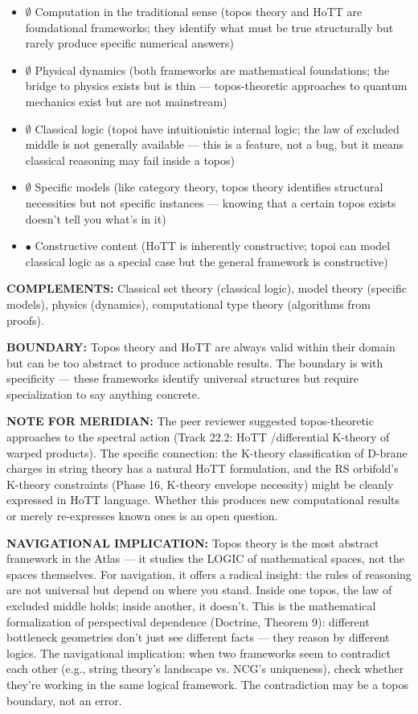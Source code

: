 \begin{itemize}[nosep,leftmargin=*]
  \item $\emptyset$ Computation in the traditional sense (topos theory and HoTT are foundational frameworks; they identify what must be true structurally but rarely produce specific numerical answers)
  \item $\emptyset$ Physical dynamics (both frameworks are mathematical foundations; the bridge to physics exists but is thin — topos-theoretic approaches to quantum mechanics exist but are not mainstream)
  \item $\emptyset$ Classical logic (topoi have intuitionistic internal logic; the law of excluded middle is not generally available — this is a feature, not a bug, but it means classical reasoning may fail inside a topos)
  \item $\emptyset$ Specific models (like category theory, topos theory identifies structural necessities but not specific instances — knowing that a certain topos exists doesn't tell you what's in it)
  \item $\bullet$ Constructive content (HoTT is inherently constructive; topoi can model classical logic as a special case but the general framework is constructive)
\end{itemize}


\textbf{COMPLEMENTS:} Classical set theory (classical logic), model theory (specific models), physics (dynamics), computational type theory (algorithms from proofs).


\textbf{BOUNDARY:} Topos theory and HoTT are always valid within their domain but can be too abstract to produce actionable results. The boundary is with specificity — these frameworks identify universal structures but require specialization to say anything concrete.


\textbf{NOTE FOR MERIDIAN:} The peer reviewer suggested topos-theoretic approaches to the spectral action (Track 22.2: HoTT /\allowbreak  differential K-theory of warped products). The specific connection: the K-theory classification of D-brane charges in string theory has a natural HoTT formulation, and the RS orbifold's K-theory constraints (Phase 16, K-theory envelope necessity) might be cleanly expressed in HoTT language. Whether this produces new computational results or merely re-expresses known ones is an open question.


\textbf{NAVIGATIONAL IMPLICATION:} Topos theory is the most abstract framework in the Atlas — it studies the LOGIC of mathematical spaces, not the spaces themselves. For navigation, it offers a radical insight: the rules of reasoning are not universal but depend on where you stand. Inside one topos, the law of excluded middle holds; inside another, it doesn't. This is the mathematical formalization of perspectival dependence (Doctrine, Theorem 9): different bottleneck geometries don't just see different facts — they reason by different logics. The navigational implication: when two frameworks seem to contradict each other (e.g., string theory's landscape vs. NCG's uniqueness), check whether they're working in the same logical framework. The contradiction may be a topos boundary, not an error.


